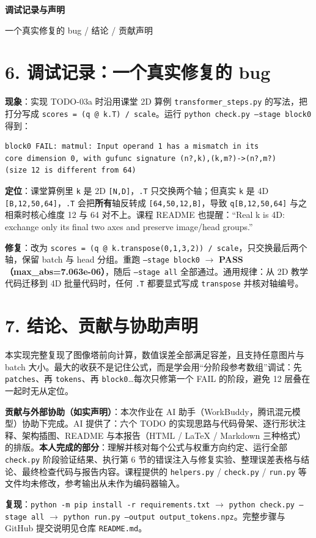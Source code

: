 \documentclass[11pt,a4paper]{article}
\newcommand{\hl}[1]{\textcolor{red!85!black}{\textbf{#1}}}
\newcommand{\code}[1]{\texttt{\small #1}}
\begin{document}
\clearpage
{\Large\bfseries 调试记录与声明\par}
{\small\color{gray} 一个真实修复的 bug / 结论 / 贡献声明\par}
\vspace{4pt}

\section*{6. 调试记录：一个真实修复的 bug}
\textbf{现象}：实现 TODO-03a 时沿用课堂 2D 算例 \code{transformer\_steps.py} 的写法，把打分写成 \code{scores = (q @ k.T) / scale}。运行 \code{python check.py --stage block0} 得到：
\begin{verbatim}
block0 FAIL: matmul: Input operand 1 has a mismatch in its
core dimension 0, with gufunc signature (n?,k),(k,m?)->(n?,m?)
(size 12 is different from 64)
\end{verbatim}
\textbf{定位}：课堂算例里 \code{k} 是 2D \code{[N,D]}，\code{.T} 只交换两个轴；但真实 \code{k} 是 4D \code{[B,12,50,64]}，\code{.T} 会把\textbf{所有}轴反转成 \code{[64,50,12,B]}，导致 \code{q[B,12,50,64]} 与之相乘时核心维度 12 与 64 对不上。课程 README 也提醒：``Real k is 4D: exchange only its final two axes and preserve image/head groups.''

\textbf{修复}：改为 \code{scores = (q @ k.transpose(0,1,3,2)) / scale}，只交换最后两个轴，保留 batch 与 head 分组。重跑 \code{--stage block0} $\to$ \hl{PASS（max\_abs=7.063e-06）}，随后 \code{--stage all} 全部通过。通用规律：从 2D 教学代码迁移到 4D 批量代码时，任何 \code{.T} 都要显式写成 \code{transpose} 并核对轴编号。

\section*{7. 结论、贡献与协助声明}
本实现完整复现了图像塔前向计算，数值误差全部满足容差，且支持任意图片与 batch 大小。最大的收获不是记住公式，而是学会用``分阶段参考数组''调试：先 \code{patches}、再 \code{tokens}、再 \code{block0}\ldots 每次只修第一个 FAIL 的阶段，避免 12 层叠在一起时无从定位。

\textbf{贡献与外部协助（如实声明）}：本次作业在 AI 助手（WorkBuddy，腾讯混元模型）协助下完成。AI 提供了：六个 TODO 的实现思路与代码骨架、逐行形状注释、架构插图、README 与本报告（HTML / LaTeX / Markdown 三种格式）的排版。\hl{本人完成的部分}：理解并核对每个公式与权重方向约定、运行全部 \code{check.py} 阶段验证结果、执行第 6 节的错误注入与修复实验、整理误差表格与结论、最终检查代码与报告内容。课程提供的 \code{helpers.py} / \code{check.py} / \code{run.py} 等文件均未修改，参考输出从未作为编码器输入。

\vspace{4pt}
\noindent\textbf{复现}：\code{python -m pip install -r requirements.txt} $\to$ \code{python check.py --stage all} $\to$ \code{python run.py --output output\_tokens.npz}。完整步骤与 GitHub 提交说明见仓库 \code{README.md}。
\end{document}
